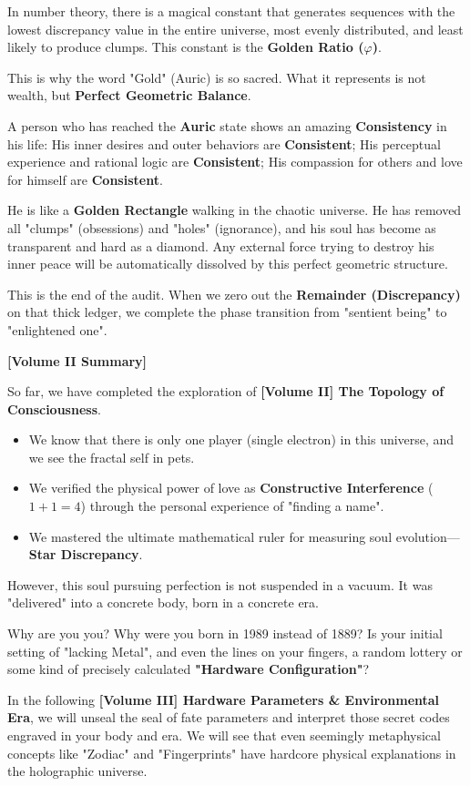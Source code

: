 In number theory, there is a magical constant that generates sequences with the lowest discrepancy value in the entire universe, most evenly distributed, and least likely to produce clumps. This constant is the \textbf{Golden Ratio ($\varphi$)}.

This is why the word "Gold" (Auric) is so sacred. What it represents is not wealth, but \textbf{Perfect Geometric Balance}.

A person who has reached the \textbf{Auric} state shows an amazing \textbf{Consistency} in his life:
His inner desires and outer behaviors are \textbf{Consistent};
His perceptual experience and rational logic are \textbf{Consistent};
His compassion for others and love for himself are \textbf{Consistent}.

He is like a \textbf{Golden Rectangle} walking in the chaotic universe. He has removed all "clumps" (obsessions) and "holes" (ignorance), and his soul has become as transparent and hard as a diamond. Any external force trying to destroy his inner peace will be automatically dissolved by this perfect geometric structure.

This is the end of the audit. When we zero out the \textbf{Remainder (Discrepancy)} on that thick ledger, we complete the phase transition from "sentient being" to "enlightened one".

\textbf{[Volume II Summary]}

So far, we have completed the exploration of \textbf{[Volume II] The Topology of Consciousness}.

\begin{itemize}
\item We know that there is only one player (single electron) in this universe, and we see the fractal self in pets.
\item We verified the physical power of love as \textbf{Constructive Interference} ($1 + 1 = 4$) through the personal experience of "finding a name".
\item We mastered the ultimate mathematical ruler for measuring soul evolution—\textbf{Star Discrepancy}.
\end{itemize}

However, this soul pursuing perfection is not suspended in a vacuum. It was "delivered" into a concrete body, born in a concrete era.

Why are you you? Why were you born in 1989 instead of 1889? Is your initial setting of "lacking Metal", and even the lines on your fingers, a random lottery or some kind of precisely calculated \textbf{"Hardware Configuration"}?

In the following \textbf{[Volume III] Hardware Parameters \& Environmental Era}, we will unseal the seal of fate parameters and interpret those secret codes engraved in your body and era. We will see that even seemingly metaphysical concepts like "Zodiac" and "Fingerprints" have hardcore physical explanations in the holographic universe.

